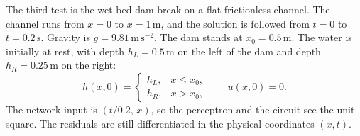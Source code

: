 \documentclass[11pt]{article}
\begin{document}
The third test is the wet-bed dam break on a flat frictionless channel. The channel runs from \(x=0\) to \(x=1\,\mathrm{m}\), and the solution is followed from \(t=0\) to \(t=0.2\,\mathrm{s}\). Gravity is \(g=9.81\,\mathrm{m\,s^{-2}}\). The dam stands at \(x_{0}=0.5\,\mathrm{m}\). The water is initially at rest, with depth \(h_{L}=0.5\,\mathrm{m}\) on the left of the dam and depth \(h_{R}=0.25\,\mathrm{m}\) on the right:
\begin{equation}
\label{eq:db-ic}
h(x,0)=
\begin{cases}
h_{L}, & x\le x_{0},\\
h_{R}, & x>x_{0},
\end{cases}
\qquad
u(x,0)=0.
\end{equation}
The network input is \((t/0.2,\,x)\), so the perceptron and the circuit see the unit square. The residuals are still differentiated in the physical coordinates \((x,t)\).
\end{document}
